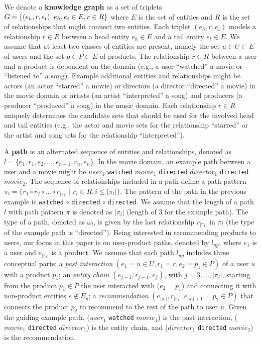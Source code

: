 \documentclass[sigconf]{acmart}
\begin{document}
We denote a \textbf{knowledge graph} as a set of triplets $G = \{(e_h, r, e_t) \\ | \; e_h, e_t \in E, r \in R\}$ where $E$ is the set of entities and $R$ is the set of relationships that might connect two entities. 
Each triplet $(e_h, r, e_t)$ models a relationship $r \in R$ between a head entity $e_h \in E$ and a tail entity $e_t \in E$. 
We assume that at least two classes of entities are present, namely the set $u \in U \subset E$ of users and the set $p \in P \subset E$ of products. 
The relationship $r \in R$ between a user and a product is dependent on the domain (e.g., a user ``watched'' a movie or ``listened to'' a song). 
Example additional entities and relationships might be actors (an actor ``starred'' a movie) or directors (a director ``directed'' a movie) in the movie domain or artists (an artist ``interpreted'' a song) and producers (a producer ``produced'' a song) in the music domain.  
Each relationship $r \in R$ uniquely determines the candidate sets that should be used for the involved head and tail entities (e.g., the actor and movie sets for the relationship ``starred'' or the artist and song sets for the relationship ``interpreted''). 

A \textbf{path} is an alternated sequence of entities and relationships, denoted as $l =\{e_1, r_1, e_2, ..., e_{n-1}, r_n, e_n \}$. 
In the movie domain, an example path between a user and a movie might be $user_1$ \texttt{watched} $movie_1$ \texttt{directed} $director_1$ \texttt{directed} $movie_2$. 
The sequence of relationships included in a path define a path pattern $\pi_l = \{r_1 \circ r_2 \circ ... \circ r_{|\pi_l|} \; | \; r_i \in R, i \leq |\pi_l|\}$.
The pattern of the path in the previous example is \texttt{watched} $\circ$ \texttt{directed} $\circ$ \texttt{directed}. 
We assume that the length of a path $l$ with path pattern $\pi$ is denoted as $|\pi_l|$ (length of 3 for the example path).
The type of a path, denoted as $\omega_l$, is given by the last relationship $r_{|\pi_l|}$ in $\pi_l$ (the type of the example path is ``directed''). 
Being interested in recommending products to users, our focus in this paper is on user-product paths, denoted by $l_{up}$, where $e_1$ is a user and $e_{|\pi_l|}$ is a product. 
We assume that each path $l_{up}$ includes three conceptual parts: a \textit{past interaction} $(e_1 = u \in U, r_1 = r, e_2 = p_1 \in P)$ of a user $u$ with a product $p_1$; 
an \textit{entity chain} $(e_{j-1}, r_{j-1}, e_j)$, with $j=3, \dots, |\pi_l|$, starting from the product $p_1 \in P$ the user interacted with ($e_2 = p_1$) and connecting it with non-product entities $e \notin E_p$; 
a \textit{recommendation} $(e_{|\pi_l|}, r_{|\pi_l|}, e_{|\pi_l| + 1} = p_2 \in P)$ that connects the product $p_2$ to recommend to the rest of the path to user $u$.
Given the guiding example path, ($user_1$ \texttt{watched} $movie_1$) is the past interaction, ($movie_1$ \texttt{directed} $director_1$) is the entity chain, and ($director_1$ \texttt{directed} $movie_2$) is the recommendation. 
\end{document}
